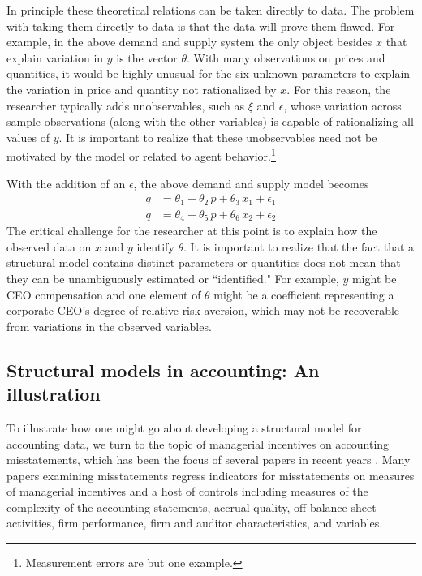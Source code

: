 In principle these theoretical relations can be taken directly to data.
The problem with taking them directly to data is that the data will prove them flawed. 
For example, in the above demand and supply system the
only object besides $x$ that explain variation in $y$ is the vector $\theta$. 
With many observations on prices and quantities, it would be highly unusual for the six unknown parameters to explain the variation in price and quantity not rationalized by $x$.
For this reason, the researcher typically adds unobservables, such as $\xi$ and $\epsilon$, whose variation across sample observations (along with the other variables) is capable of rationalizing 
all values of $y$.
It is important to realize that these unobservables need not be motivated by the model or related to agent behavior.\footnote{Measurement errors are but one example.}

With the addition of an $\epsilon$, the above demand and supply model becomes 
\begin{align*}
q &=  \theta_1 + \theta_2 \, p + \theta_3 \, x_1 + \epsilon_1 \\ 
q &=  \theta_4 + \theta_5\, p + \theta_6 \, x_2 + \epsilon_2
\end{align*}
The critical challenge for the researcher at this point is to explain how the observed data on $x$ and $y$ identify $\theta$. 
It is important to realize that the fact that a structural model contains distinct parameters or quantities does not mean that they can be unambiguously estimated or ``identified." 
For example, $y$ might be CEO compensation and one element of $\theta$ might be a coefficient representing a corporate CEO's degree of relative risk aversion, which may not be recoverable from variations in the observed variables.

\subsection{Structural models in accounting: An illustration}
To illustrate how one might go about developing a structural model for accounting data, we turn to the topic of managerial incentives on accounting misstatements, which has been the focus of several papers in recent years \citep[see][]{Armstrong:2010jd}.
Many papers examining misstatements regress indicators for misstatements on measures of managerial incentives and a host of controls including measures of the complexity of the accounting statements, accrual quality, off-balance sheet activities, firm performance, firm and auditor characteristics, and variables. 

